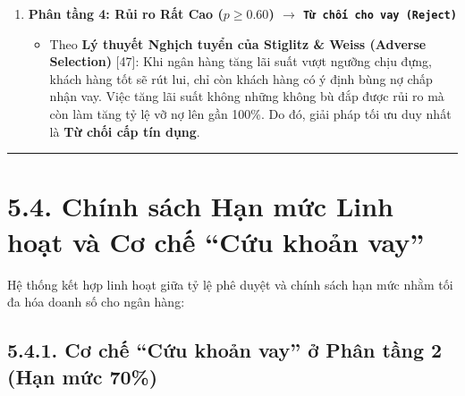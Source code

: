 \documentclass[
  13pt,
  a4paper,
]{report}
\providecommand{\tightlist}{%
  \setlength{\itemsep}{0pt}\setlength{\parskip}{0pt}}
\begin{document}
\begin{enumerate}
  \begin{itemize}
  \tightlist
  \item
    Mức \(p\) trung bình của nhóm: \(p_{\text{tb}} \approx 0.40\)
    (40\%).
  \item
    Phụ phí bù đắp rủi ro:
    \(\Delta_{\text{Risk}} = 0.40 \times 0.15 = 0.06\) (6.0\%).
  \item
    Lãi suất đề xuất:
    \(R_3 = R_{\text{base}} + \Delta_{\text{Risk}} = 0.085 + 0.06 = 0.145\)
    (14.5\%/năm).
  \item
    Mức lãi suất phản ánh đúng mức bù trừ rủi ro cho nhóm khách hàng có
    khả năng chậm trả cao, đồng thời bắt buộc phải có tài sản bảo đảm đi
    kèm.
  \end{itemize}
\item
  \textbf{Phân tầng 4: Rủi ro Rất Cao (\(p \ge 0.60\)) \(\rightarrow\)
  \texttt{Từ\ chối\ cho\ vay\ (Reject)}}

  \begin{itemize}
  \tightlist
  \item
    Theo \textbf{Lý thuyết Nghịch tuyển của Stiglitz \& Weiss (Adverse
    Selection)} {[}47{]}: Khi ngân hàng tăng lãi suất vượt ngưỡng chịu
    đựng, khách hàng tốt sẽ rút lui, chỉ còn khách hàng có ý định bùng
    nợ chấp nhận vay. Việc tăng lãi suất không những không bù đắp được
    rủi ro mà còn làm tăng tỷ lệ vỡ nợ lên gần 100\%. Do đó, giải pháp
    tối ưu duy nhất là \textbf{Từ chối cấp tín dụng}.
  \end{itemize}
\end{enumerate}

\begin{center}\rule{0.5\linewidth}{0.5pt}\end{center}

\section{5.4. Chính sách Hạn mức Linh hoạt và Cơ chế ``Cứu khoản
vay''}\label{chuxednh-suxe1ch-hux1ea1n-mux1ee9c-linh-houx1ea1t-vuxe0-cux1a1-chux1ebf-cux1ee9u-khoux1ea3n-vay}

Hệ thống kết hợp linh hoạt giữa tỷ lệ phê duyệt và chính sách hạn mức
nhằm tối đa hóa doanh số cho ngân hàng:

\subsection{5.4.1. Cơ chế ``Cứu khoản vay'' ở Phân tầng 2 (Hạn mức
70\%)}\label{cux1a1-chux1ebf-cux1ee9u-khoux1ea3n-vay-ux1edf-phuxe2n-tux1ea7ng-2-hux1ea1n-mux1ee9c-70}
\end{document}
